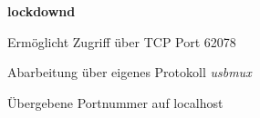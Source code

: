 \begin{frame}
	\centering
	\textbf{lockdownd}
	\begin{block}{}
		Ermöglicht Zugriff über TCP Port 62078
	\end{block}
	\begin{block}{}
		Abarbeitung über eigenes Protokoll \textsl{usbmux}
	\end{block}
	\begin{block}{}
		Übergebene Portnummer auf localhost
	\end{block}

\end{frame}